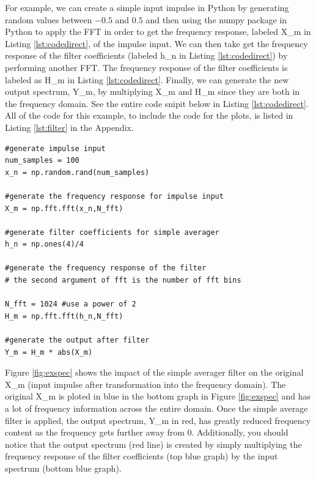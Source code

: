 For example, we can create a simple input impulse in Python by
generating random values between $-0.5$ and $0.5$ and then using
the numpy package in Python to apply the FFT in order to get the
frequency response, labeled X\_m in Listing
\ref{lst:codedirect}, of the impulse input. We can then take get
the frequency response of the filter coefficients (labeled h\_n
in Listing \ref{lst:codedirect}) by performing another FFT. The
frequency response of the filter coefficients is labeled as
H\_m in Listing \ref{lst:codedirect}. Finally, we can
generate the new output spectrum, Y\_m, by multiplying X\_m
and H\_m since they are both in the frequency
domain. See the entire code snipit below in Listing
\ref{lst:codedirect}. All of the code for this example, to include
the code for the plots, is listed in Listing \ref{lst:filter} in the Appendix.  

\lstset{language=Python}
\lstset{frame=lines}
\lstset{basicstyle=\footnotesize}
\begin{lstlisting}
#generate impulse input
num_samples = 100
x_n = np.random.rand(num_samples)

#generate the frequency response for impulse input
X_m = np.fft.fft(x_n,N_fft)

#generate filter coefficients for simple averager
h_n = np.ones(4)/4

#generate the frequency response of the filter
# the second argument of fft is the number of fft bins

N_fft = 1024 #use a power of 2
H_m = np.fft.fft(h_n,N_fft)

#generate the output after filter
Y_m = H_m * abs(X_m)
\end{lstlisting}

Figure \ref{fig:exspec} shows the impact of the simple averager
filter on the original X\_m (input impulse after transformation
into the frequency domain). The original X\_m is ploted in blue
in the bottom graph in Figure \ref{fig:exspec} and has a lot of
frequency information across the entire domain. Once the simple
average filter is applied, the output spectrum, Y\_m in red, has
greatly reduced frequency content as the frequency gets further
away from 0. Additionally, you should notice that the output
spectrum (red line) is created by simply multiplying the
frequency response of the filter coefficients (top blue graph) by
the input spectrum (bottom blue graph).  

